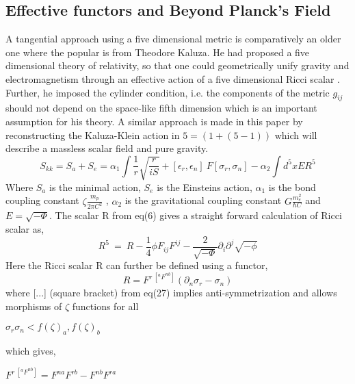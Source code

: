 \documentclass{article}
\begin{document}
 \subsection{Effective functors and Beyond Planck's Field}
 A tangential approach using a five dimensional metric is comparatively an older one where the popular is from Theodore Kaluza. He had proposed a five dimensional theory of relativity, so that one could geometrically unify gravity and electromagnetism through an effective action of a five dimensional Ricci scalar \cite{17}. Further, he imposed the cylinder condition, i.e. the components of the metric $g_{ij}$ should not depend on the space-like fifth dimension which is an important assumption for his theory. A similar approach is made in this paper by reconstructing the Kaluza-Klein action in $ 5= (1+(5-1))$ which will describe a massless scalar field and pure gravity.
 \begin{equation}
     S_{kk}= S_a+S_e= \alpha_1 \int \frac{1}{r} \sqrt{\frac{r}{iS}} + [\epsilon_r, \epsilon_n] \ F [\sigma_r ,\sigma_n] - \alpha_2 \int d^5xER^5
 \end{equation}
 Where $S_a$ is the minimal action, $S_e$ is the Einsteins action, $\alpha_1$ is the bond coupling constant
$\zeta \frac{m_p}{2\pi C^2} $ , $\alpha_2$ is the gravitational coupling constant
 $ G\frac{ m_e^2}{\hbar C} $ and $ E=\sqrt{-\Phi}$. The scalar R from eq(6) gives a straight forward calculation of Ricci scalar as, \begin{equation}
     R^5 \ = \ R - \frac{1}{4} \phi F_{ij}F^{ij} - \frac{2}{\sqrt{-\Phi}} \partial_i \partial^j \sqrt{-\phi}
 \end{equation} 
 Here the Ricci scalar R can further be defined using a functor, 
 \begin{equation}
     R=F^{r \ [^a F^{nb}]} (\partial_n \sigma_r - \sigma_n)
 \end{equation}
where [...] (square bracket) from eq(27) implies anti-symmetrization and allows morphisms of $\zeta$ functions for all \begin{center}
 \begin{math}
    \sigma_r \sigma_n < f(\zeta)_a, f(\zeta)_b
 \end{math}
 \end{center}
 which gives,
 \begin{center}
 \begin{math}
     F^{r \ [^a F^{nb}]} = F^{na} F^{rb} - F^{nb} F^{ra} 
 \end{math}
 \end{center}
\end{document}
